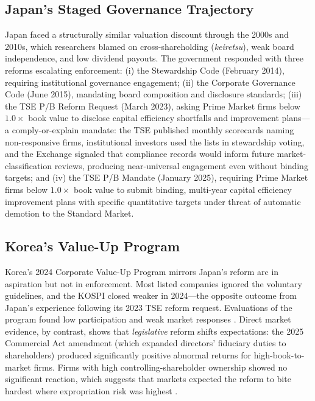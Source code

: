 \documentclass[12pt]{article}
\begin{document}
\subsection{Japan's Staged Governance Trajectory}

Japan faced a structurally similar valuation discount through the 2000s and 2010s, which researchers blamed on cross-shareholding (\textit{keiretsu}), weak board independence, and low dividend payouts. The government responded with three reforms escalating enforcement: (i) the Stewardship Code (February 2014), requiring institutional governance engagement; (ii) the Corporate Governance Code (June 2015), mandating board composition and disclosure standards; (iii) the TSE P/B Reform Request (March 2023), asking Prime Market firms below $1.0\times$ book value to disclose capital efficiency shortfalls and improvement plans---a comply-or-explain mandate: the TSE published monthly scorecards naming non-responsive firms, institutional investors used the lists in stewardship voting, and the Exchange signaled that compliance records would inform future market-classification reviews, producing near-universal engagement even without binding targets; and (iv) the TSE P/B Mandate (January 2025), requiring Prime Market firms below $1.0\times$ book value to submit binding, multi-year capital efficiency improvement plans with specific quantitative targets under threat of automatic demotion to the Standard Market.

\subsection{Korea's Value-Up Program}

Korea's 2024 Corporate Value-Up Program mirrors Japan's reform arc in aspiration but not in enforcement. Most listed companies ignored the voluntary guidelines, and the KOSPI closed weaker in 2024---the opposite outcome from Japan's experience following its 2023 TSE reform request. Evaluations of the program found low participation and weak market responses \citep{lee2025valueup}. Direct market evidence, by contrast, shows that \emph{legislative} reform shifts expectations: the 2025 Commercial Act amendment (which expanded directors' fiduciary duties to shareholders) produced significantly positive abnormal returns for high-book-to-market firms. Firms with high controlling-shareholder ownership showed no significant reaction, which suggests that markets expected the reform to bite hardest where expropriation risk was highest \citep{kang2026commercial}.
\end{document}
